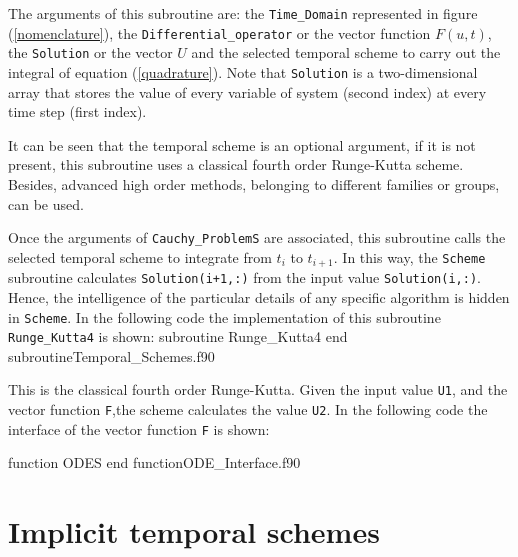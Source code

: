  The arguments of this subroutine are: the \verb|Time_Domain|  represented in figure (\ref{nomenclature}), 
 the \verb|Differential_operator| or the vector function $ F(u,t) $, the \verb|Solution| or the vector $ U $ and the selected temporal scheme to carry out the integral of equation 
 (\ref{quadrature}). Note that \verb|Solution| is a two-dimensional array that stores the value of every variable of system (second index) at every time step (first index). 
 
 It can be seen that the temporal scheme is an optional argument, if it is  not present, this subroutine uses a classical fourth order Runge-Kutta scheme. Besides, advanced high order methods, belonging to different families or groups, can be used. 
 
 \newpage 
 
 Once the arguments of \verb|Cauchy_ProblemS| are associated, this subroutine calls the selected temporal scheme to integrate from 
 $ t_i $ to $ t_{i+1} $. In this way, the \verb|Scheme| subroutine calculates \verb|Solution(i+1,:)| from the input value 
 \verb|Solution(i,:)|.
 Hence, the intelligence of the particular details of any specific algorithm is hidden in \verb|Scheme|. 
 In the following code the implementation of this subroutine \verb|Runge_Kutta4| is shown: 
       \vspace{0.5cm} 
       {subroutine Runge_Kutta4}
       {end subroutine}{Temporal_Schemes.f90}
 
 This is the classical fourth order Runge-Kutta. Given the input value \verb|U1|, and the vector function \verb|F|,the scheme calculates the value \verb|U2|. 
 In the following code the interface of the vector function \verb|F| is shown: 
  
 \vspace{0.5cm} 
        {function ODES}
        {end function}{ODE_Interface.f90}
 
 
  
  
 \section{Implicit temporal schemes}
 
